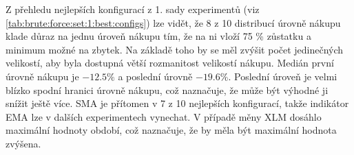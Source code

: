 Z přehledu nejlepších konfigurací z 1. sady experimentů (viz \ref{tab:brute:force:set:1:best:configs}) lze vidět, že 8 z 10 distribucí úrovně nákupu klade důraz na jednu úroveň nákupu tím, že na ni vloží 75 \% zůstatku a minimum možné na zbytek.
Na základě toho by se měl zvýšit počet jedinečných velikostí, aby byla dostupná větší rozmanitost velikostí nákupu.
Medián první úrovně nákupu je \(-12.5 \% \) a poslední úrovně \( -19.6 \% \). 
Poslední úroveň je velmi blízko spodní hranici úrovně nákupu, což naznačuje, že může být výhodné ji snížit ještě více.
SMA je přítomen v 7 z 10 nejlepších konfigurací, takže indikátor EMA lze v dalších experimentech vynechat.
V případě měny XLM dosáhlo maximální hodnoty období, což naznačuje, že by měla být maximální hodnota zvýšena.

